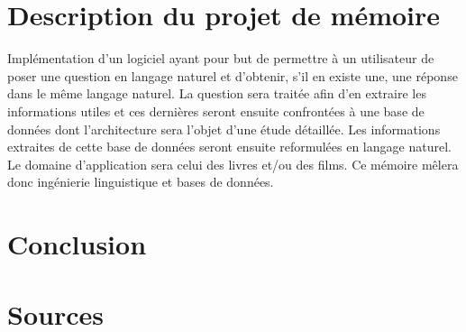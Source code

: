 \documentclass[11pt]{article}
\begin{document}
\section{Description du projet de mémoire}
Implémentation d’un logiciel ayant pour but de permettre  à un utilisateur de poser une question en langage naturel et d’obtenir, s’il en existe une, une réponse dans le même langage naturel. La question sera traitée afin d’en extraire les informations utiles et ces dernières seront ensuite confrontées à une base de données dont l’architecture sera l’objet d’une étude détaillée. Les informations extraites de cette base de données seront ensuite reformulées en langage naturel. Le domaine d’application sera celui des livres et/ou des films. Ce mémoire mêlera donc ingénierie linguistique et bases de données.

\section{Conclusion}

\newpage
\section{Sources}
\nocite{*}
\printbibliography
\end{document}
